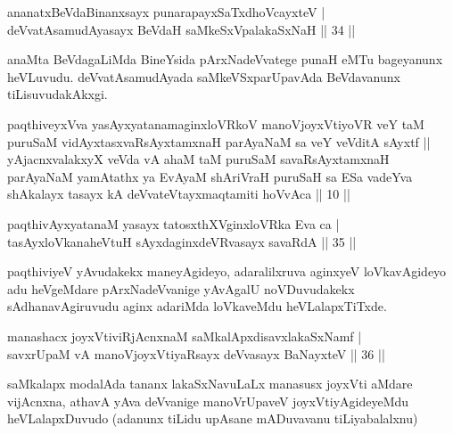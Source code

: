 \begin{shl}
ananatxBeVdaBinanxsayx punarapayxSaTxdhoVcayxteV |\\
deVvatAsamudAyasayx BeVdaH saMkeSxVpalakaSxNaH \hfill || 34 ||
\end{shl}

\begin{artha}
anaMta BeVdagaLiMda BineYsida pArxNadeVvatege punaH eMTu bageyanunx heVLuvudu. deVvatAsamudAyada saMkeVSxparUpavAda BeVdavanunx tiLisuvudakAkxgi.
\end{artha}


\begin{kandikeshl}
paqthiveyxVva yasAyxyatanamaginxloVRkoV manoVjoyxVtiyoVR veY taM puruSaM vidAyxtasxvaRsAyxtamxnaH parAyaNaM sa veY veVditA sAyxtf || yAjacnxvalakxyX veVda vA ahaM taM puruSaM savaRsAyxtamxnaH parAyaNaM yamAtathx ya EvAyaM shAriVraH puruSaH sa ESa vadeYva shAkalayx tasayx kA deVvateVtayxmaqtamiti hoVvAca || 10 ||
\end{kandikeshl}


\begin{shl}
paqthivAyxyatanaM yasayx tatosxthXV\s ginxloVRka Eva ca |\\
tasAyx\s \s loVkanaheVtuH sAyxdaginxdeVRvasayx savaRdA \hfill || 35 ||
\end{shl}

\begin{artha}
paqthiviyeV yAvudakekx maneyAgideyo, adaralilxruva aginxyeV loVkavAgideyo adu heVgeMdare pArxNadeVvanige yAvAgalU noVDuvudakekx sAdhanavAgiruvudu aginx adariMda loVkaveMdu heVLalapxTiTxde.
\end{artha}


\begin{shl}
manashacx joyxVtiviRjAcnxnaM saMkalApxdisavxlakaSxNamf |\\
savxrUpaM vA manoVjoyxVtiyaRsayx deVvasayx BaNayxteV \hfill || 36 ||
\end{shl}

\begin{artha}
saMkalapx modalAda tananx lakaSxNavuLaLx manasusx joyxVti aMdare vijAcnxna, athavA yAva deVvanige manoVrUpaveV joyxVtiyAgideyeMdu heVLalapxDuvudo (adanunx tiLidu upAsane mADuvavanu tiLiyabalalxnu)
\end{artha}

